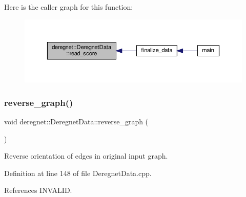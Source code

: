 Here is the caller graph for this function\+:\nopagebreak
\begin{figure}[H]
\begin{center}
\leavevmode
\includegraphics[width=350pt]{classderegnet_1_1DeregnetData_a01308048556370738e4ac335aba62ffd_icgraph}
\end{center}
\end{figure}
\mbox{\label{classderegnet_1_1DeregnetData_aa36e9ddbc2d055ac7661e74f8fa76da4}} 
\subsubsection{\texorpdfstring{reverse\+\_\+graph()}{reverse\_graph()}}
{\footnotesize\ttfamily void deregnet\+::\+Deregnet\+Data\+::reverse\+\_\+graph (\begin{DoxyParamCaption}{ }\end{DoxyParamCaption})\hspace{0.3cm}{\ttfamily [private]}}



Reverse orientation of edges in original input graph. 



Definition at line 148 of file Deregnet\+Data.\+cpp.



References I\+N\+V\+A\+L\+ID.


